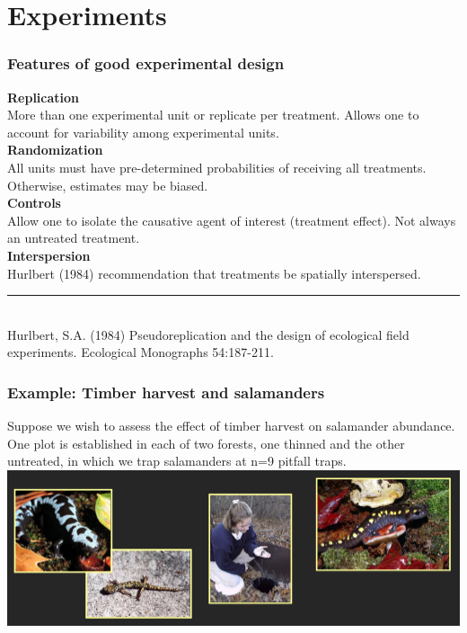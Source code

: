 \documentclass[color=usenames,dvipsnames]{beamer}\usepackage[]{graphicx}\usepackage[]{color}
\begin{document}
\section{Experiments}


\begin{frame}
  \frametitle{Features of good experimental design}
  {\bf Replication} \\
  More than one experimental unit or replicate per treatment. Allows
  one to account for variability among experimental units. \\
  \pause
  \vfill
  {\bf Randomization} \\
  All units must have pre-determined probabilities of receiving all
  treatments. Otherwise, estimates may be biased. \\
  \pause
  \vfill
  {\bf Controls} \\
  Allow one to isolate the causative agent of interest (treatment
  effect).  Not always an untreated treatment. \\
  \pause
  \vfill
  {\bf Interspersion} \\
  Hurlbert (1984) recommendation that treatments be spatially interspersed.  \\
  \vspace{1pt}
  \rule[0mm]{1cm}{0.1mm} \\
  \footnotesize
  Hurlbert, S.A. (1984) Pseudoreplication and the design of ecological field
  experiments.  Ecological Monographs 54:187-211.
\end{frame}



\begin{frame}
  \frametitle{Example: Timber harvest and salamanders}
  Suppose we wish to assess the effect of timber harvest on salamander
  abundance.  One plot is established in each of two forests, one
  thinned and the other untreated, in which we trap salamanders at n=9
  pitfall traps.  %
  \vfill
  \centering
  \includegraphics[width=\textwidth]{salamanders} \\
\end{frame}
\end{document}

